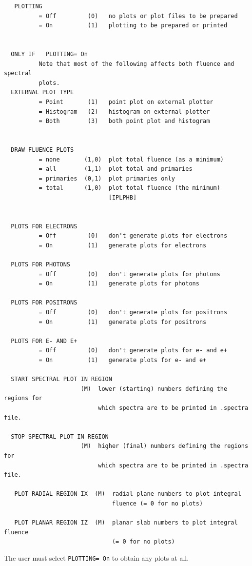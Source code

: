 \documentclass[12pt,twoside]{article}  %
\begin{document}
\begin{verbatim}
   PLOTTING
          = Off         (0)   no plots or plot files to be prepared
          = On          (1)   plotting to be prepared or printed


  ONLY IF   PLOTTING= On
          Note that most of the following affects both fluence and spectral
          plots.
  EXTERNAL PLOT TYPE
          = Point       (1)   point plot on external plotter
          = Histogram   (2)   histogram on external plotter
          = Both        (3)   both point plot and histogram


  DRAW FLUENCE PLOTS
          = none       (1,0)  plot total fluence (as a minimum)
          = all        (1,1)  plot total and primaries
          = primaries  (0,1)  plot primaries only
          = total      (1,0)  plot total fluence (the minimum)
                              [IPLPHB]


  PLOTS FOR ELECTRONS
          = Off         (0)   don't generate plots for electrons
          = On          (1)   generate plots for electrons

  PLOTS FOR PHOTONS
          = Off         (0)   don't generate plots for photons
          = On          (1)   generate plots for photons

  PLOTS FOR POSITRONS
          = Off         (0)   don't generate plots for positrons
          = On          (1)   generate plots for positrons

  PLOTS FOR E- AND E+
          = Off         (0)   don't generate plots for e- and e+
          = On          (1)   generate plots for e- and e+

  START SPECTRAL PLOT IN REGION
                      (M)  lower (starting) numbers defining the regions for
                           which spectra are to be printed in .spectra file.

  STOP SPECTRAL PLOT IN REGION
                      (M)  higher (final) numbers defining the regions for
                           which spectra are to be printed in .spectra file.

   PLOT RADIAL REGION IX  (M)  radial plane numbers to plot integral
                               fluence (= 0 for no plots)

   PLOT PLANAR REGION IZ  (M)  planar slab numbers to plot integral fluence
                               (= 0 for no plots)
\end{verbatim}

The user must select {\tt PLOTTING= On} to obtain any plots at all.
\end{document}
